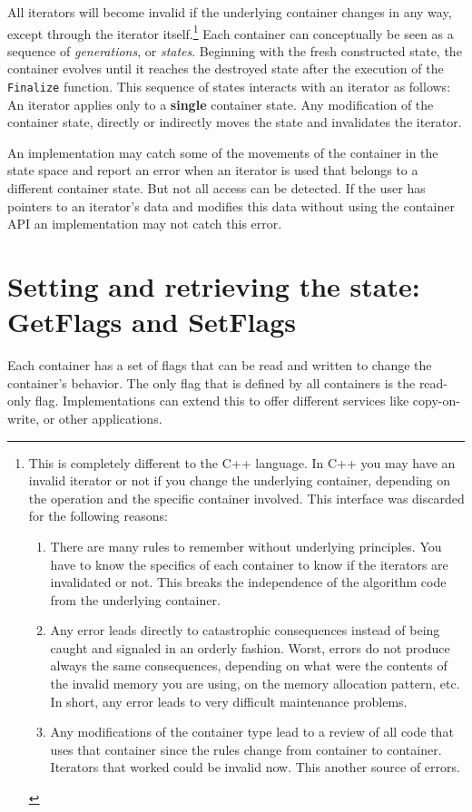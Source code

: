 \documentclass[12pt,a4paper]{memoir} %
\begin{document}
All iterators will become invalid if the underlying container changes in any way, except through the iterator itself.\footnote{This is completely 
different to the C++ language. In C++ you may have an invalid iterator or not if you change the underlying container, depending on the 
operation and the specific container involved. This interface was discarded for the following reasons:
\begin{enumerate}
\item There are many rules to remember without underlying principles.
  You have to know the specifics of each container to know
  if the iterators are invalidated or not. This breaks the independence
   of the algorithm code from the underlying container.

\item Any error leads directly to catastrophic consequences instead
   of being caught and signaled in an orderly fashion. Worst, errors
   do not produce always the same consequences, depending on what
   were the contents of the invalid memory you are using, on the
   memory allocation pattern, etc. In short, any error leads to
   very difficult maintenance problems.

\item Any modifications of the container type lead to a review of
   all code that uses that container since the rules change from
   container to container. Iterators that worked could be invalid
   now. This another source of errors.
\end{enumerate}
}
Each container can conceptually be seen as a sequence of \textsl{generations}, or \textsl{states}. Beginning with the fresh constructed state, the container
evolves until it reaches the destroyed state after the execution of the \verb,Finalize, function. This sequence of states interacts with an
iterator as follows: An iterator applies only to a \textbf{single} container state. Any modification of the container state, directly or
indirectly moves the state and invalidates the iterator.

An implementation may catch some of the movements of the container in the state space and report an error when an iterator is used that belongs to 
a different container state. But not all access can be detected. If the user has pointers to an iterator's data and modifies this data without
using the container API an implementation may not catch this error.

\section{Setting and retrieving the state: GetFlags and SetFlags}
Each container has a set of flags that can be read and written to change the container's behavior. The only flag that is defined by all containers
is the read-only flag. Implementations can extend this to offer different services like copy-on-write, or other applications. 
\end{document}
